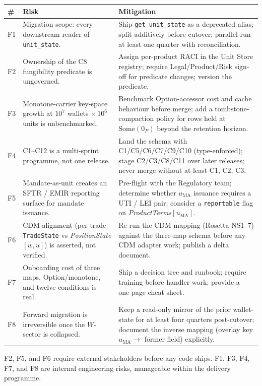 \documentclass[11pt,a4paper]{article}
\begin{document}
\begin{longtable}{p{0.7cm}p{6.3cm}p{7.5cm}}
\toprule
\textbf{\#} & \textbf{Risk} & \textbf{Mitigation} \\
\midrule
F1 & Migration scope: every downstream reader of \texttt{unit\_state}. & Ship
\texttt{get\_unit\_state} as a deprecated alias; split additively before cutover;
parallel-run at least one quarter with reconciliation. \\
\addlinespace
F2 & Ownership of the C8 fungibility predicate is ungoverned. & Assign per-product RACI in
the Unit Store registry; require Legal/Product/Risk sign-off for predicate changes; version
the predicate. \\
\addlinespace
F3 & Monotone-carrier key-space growth at $10^7$ wallets $\times\,10^6$ units is
unbenchmarked. & Benchmark Option-accessor cost and cache behaviour before merge; add a
tombstone-compaction policy for rows held at $\mathrm{Some}(0_P)$ beyond the retention
horizon. \\
\addlinespace
F4 & C1--C12 is a multi-sprint programme, not one release. & Land the schema with
C1/C5/C6/C7/C9/C10 (type-enforced); stage C2/C3/C8/C11 over later releases; never merge
without at least C1, C2, C3. \\
\addlinespace
F5 & Mandate-as-unit creates an SFTR / EMIR reporting surface for mandate issuance. &
Pre-flight with the Regulatory team; determine whether $u_{\mathrm{MA}}$ issuance requires a
UTI / LEI pair; consider a \texttt{reportable} flag on
\emph{ProductTerms}$[u_{\mathrm{MA}}]$. \\
\addlinespace
F6 & CDM alignment (per-trade \texttt{TradeState} vs \emph{PositionState}$[w,u]$) is
asserted, not verified. & Re-run the CDM mapping (Rosetta NS1--7) against the three-map schema
before any CDM adapter work; publish a delta document. \\
\addlinespace
F7 & Onboarding cost of three maps, Option/monotone, and twelve conditions is real. & Ship a
decision tree and runbook; require training before handler work; provide a one-page cheat
sheet. \\
\addlinespace
F8 & Forward migration is irreversible once the $W$-sector is collapsed. & Keep a read-only
mirror of the prior wallet-state for at least four quarters post-cutover; document the
inverse mapping (overlay key $u_{\mathrm{MA}}\to$ former field) explicitly. \\
\bottomrule
\end{longtable}

\noindent F2, F5, and F6 require external stakeholders before any code ships. F1, F3, F4,
F7, and F8 are internal engineering risks, manageable within the delivery programme.
\end{document}
